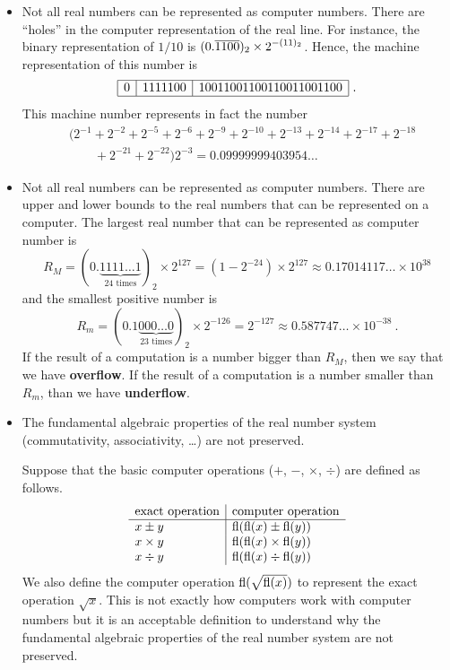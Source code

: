 \begin{itemize}
\item Not all real numbers can be represented as computer numbers.
There are ``holes'' in the computer representation of the real line.
For instance, the binary representation of $1/10$ is
$\displaystyle (0.\overline{1100})_2 \times 2^{-(11)_2}$.  Hence, the machine
representation of this number is
\[
\begin{array}{|c|c|c|}
\hline
0 & 1111100 & 10011001100110011001100 \\
\hline
\end{array} \ .
\]
This machine number represents in fact the number
\begin{align*}
&\big( 2^{-1} + 2^{-2} + 2^{-5} + 2^{-6} + 2^{-9} + 2^{-10} +
2^{-13} + 2^{-14} + 2^{-17} + 2^{-18} \\
&\qquad + 2^{-21} + 2^{-22}\big) 2^{-3} = 0.09999999403954\ldots
\end{align*}
\item Not all real numbers can be represented as computer numbers.
There are upper and lower bounds to the real numbers that can be
represented on a computer. The largest real number that can be
represented as computer number is
\[
R_M =(0.\underbrace{1111\ldots1}_{\text{24 times}})_2 \times 2^{127} =
( 1 - 2^{-24})\times 2^{127} \approx 0.17014117\ldots \times 10^{38}
\]
and the smallest positive number is
\[
R_m =(0.1\underbrace{000\ldots0}_{\text{23 times}})_2 \times 2^{-126}
= 2^{-127} \approx 0.587747\ldots \times 10^{-38}  \ .
\]
If the result of a computation is a number bigger than $R_M$, then we
say that we have {\bfseries overflow}.  If the result
of a computation is a number smaller than $R_m$, than we have
{\bfseries underflow}.

\item The fundamental algebraic properties of the real number system
(commutativity, associativity, \ldots) are not preserved. 

Suppose that the basic computer operations ($+$, $-$, $\times$,
$\div$) are defined as follows. 
\[
\begin{array}{l|l}
\text{exact operation} & \text{computer operation} \\
\hline
x \pm y & \operatorname{fl}(\operatorname{fl}(x) \pm \operatorname{fl}(y)) \\
x \times y & \operatorname{fl}(\operatorname{fl}(x) \times \operatorname{fl}(y))\\
x \div y & \operatorname{fl}(\operatorname{fl}(x) \div \operatorname{fl}(y))
\end{array}
\]
We also define the computer operation $\operatorname{fl}(\sqrt{\operatorname{fl}(x)})$ to
represent the exact operation $\sqrt{x}$.  This is not exactly how
computers work with computer numbers but it is an acceptable
definition to understand why the fundamental algebraic
properties of the real number system are not preserved.


\end{itemize}
